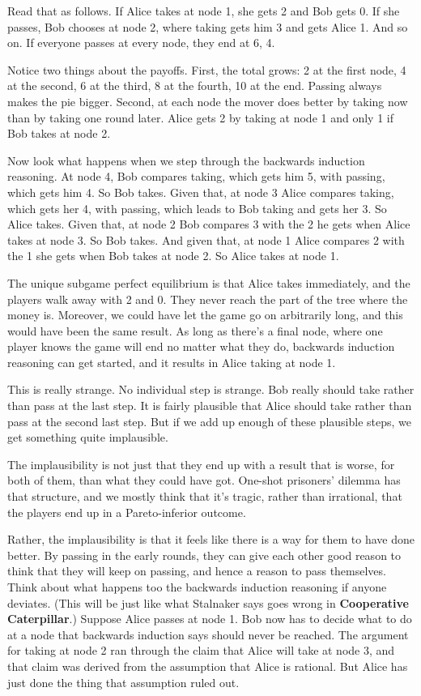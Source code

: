 \documentclass[
  11pt,
  letterpaper,
]{scrbook}
\begin{document}
Read that as follows. If Alice takes at node 1, she gets 2 and Bob gets
0. If she passes, Bob chooses at node 2, where taking gets him 3 and
gets Alice 1. And so on. If everyone passes at every node, they end at
6, 4.

Notice two things about the payoffs. First, the total grows: 2 at the
first node, 4 at the second, 6 at the third, 8 at the fourth, 10 at the
end. Passing always makes the pie bigger. Second, at each node the mover
does better by taking now than by taking one round later. Alice gets 2
by taking at node 1 and only 1 if Bob takes at node 2.

Now look what happens when we step through the backwards induction
reasoning. At node 4, Bob compares taking, which gets him 5, with
passing, which gets him 4. So Bob takes. Given that, at node 3 Alice
compares taking, which gets her 4, with passing, which leads to Bob
taking and gets her 3. So Alice takes. Given that, at node 2 Bob
compares 3 with the 2 he gets when Alice takes at node 3. So Bob takes.
And given that, at node 1 Alice compares 2 with the 1 she gets when Bob
takes at node 2. So Alice takes at node 1.

The unique subgame perfect equilibrium is that Alice takes immediately,
and the players walk away with 2 and 0. They never reach the part of the
tree where the money is. Moreover, we could have let the game go on
arbitrarily long, and this would have been the same result. As long as
there's a final node, where one player knows the game will end no matter
what they do, backwards induction reasoning can get started, and it
results in Alice taking at node 1.

This is really strange. No individual step is strange. Bob really should
take rather than pass at the last step. It is fairly plausible that
Alice should take rather than pass at the second last step. But if we
add up enough of these plausible steps, we get something quite
implausible.

The implausibility is not just that they end up with a result that is
worse, for both of them, than what they could have got. One-shot
prisoners' dilemma has that structure, and we mostly think that it's
tragic, rather than irrational, that the players end up in a
Pareto-inferior outcome.

Rather, the implausibility is that it feels like there is a way for them
to have done better. By passing in the early rounds, they can give each
other good reason to think that they will keep on passing, and hence a
reason to pass themselves. Think about what happens too the backwards
induction reasoning if anyone deviates. (This will be just like what
Stalnaker says goes wrong in \textbf{Cooperative Caterpillar}.) Suppose
Alice passes at node 1. Bob now has to decide what to do at a node that
backwards induction says should never be reached. The argument for
taking at node 2 ran through the claim that Alice will take at node 3,
and that claim was derived from the assumption that Alice is rational.
But Alice has just done the thing that assumption ruled out.
\end{document}

